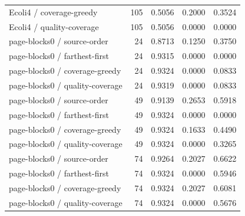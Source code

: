 \begin{longtable}{lrrrr}
Ecoli4 / coverage-greedy & 105 & 0.5056 & 0.2000 & 0.3524 \\
Ecoli4 / quality-coverage & 105 & 0.5056 & 0.0000 & 0.0000 \\
page-blocks0 / source-order & 24 & 0.8713 & 0.1250 & 0.3750 \\
page-blocks0 / farthest-first & 24 & 0.9315 & 0.0000 & 0.0000 \\
page-blocks0 / coverage-greedy & 24 & 0.9324 & 0.0000 & 0.0833 \\
page-blocks0 / quality-coverage & 24 & 0.9319 & 0.0000 & 0.0833 \\
page-blocks0 / source-order & 49 & 0.9139 & 0.2653 & 0.5918 \\
page-blocks0 / farthest-first & 49 & 0.9324 & 0.0000 & 0.0000 \\
page-blocks0 / coverage-greedy & 49 & 0.9324 & 0.1633 & 0.4490 \\
page-blocks0 / quality-coverage & 49 & 0.9324 & 0.0000 & 0.3265 \\
page-blocks0 / source-order & 74 & 0.9264 & 0.2027 & 0.6622 \\
page-blocks0 / farthest-first & 74 & 0.9324 & 0.0000 & 0.5946 \\
page-blocks0 / coverage-greedy & 74 & 0.9324 & 0.2027 & 0.6081 \\
page-blocks0 / quality-coverage & 74 & 0.9324 & 0.0000 & 0.5676 \\
\bottomrule
\end{longtable}
